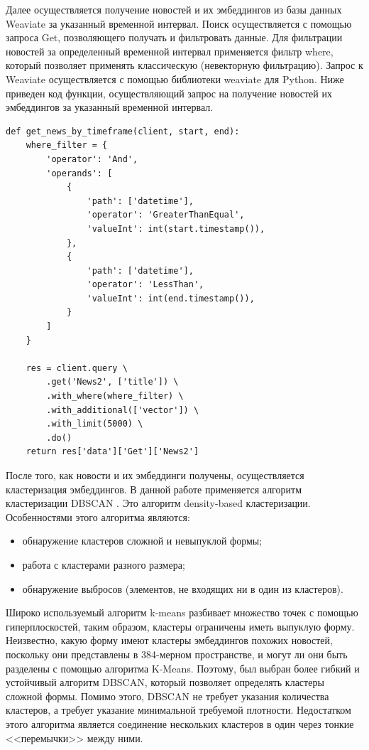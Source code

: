 Далее осуществляется получение новостей и их эмбеддингов из базы данных Weaviate за указанный временной интервал. Поиск осуществляется с помощью запроса Get{}, позволяющего получать и фильтровать данные. Для фильтрации новостей за определенный временной интервал применяется фильтр where, который позволяет применять классическую (невекторную фильтрацию). Запрос к Weaviate осуществляется с помощью библиотеки weaviate для Python. Ниже приведен код функции, осуществляющий запрос на получение новостей их эмбеддингов за указанный временной интервал.

\begin{lstlisting}
def get_news_by_timeframe(client, start, end):
    where_filter = {
        'operator': 'And',
        'operands': [
            {
                'path': ['datetime'],
                'operator': 'GreaterThanEqual',
                'valueInt': int(start.timestamp()),
            },
            {
                'path': ['datetime'],
                'operator': 'LessThan',
                'valueInt': int(end.timestamp()),
            }
        ]
    }

    res = client.query \
        .get('News2', ['title']) \
        .with_where(where_filter) \
        .with_additional(['vector']) \
        .with_limit(5000) \
        .do()
    return res['data']['Get']['News2']
\end{lstlisting}

После того, как новости и их эмбеддинги получены, осуществляется кластеризация эмбеддингов. В данной работе применяется алгоритм кластеризации DBSCAN \cite{clustering-algs}. Это алгоритм density-based кластеризации. Особенностями этого алгоритма являются:
\begin{itemize}
    \item обнаружение кластеров сложной и невыпуклой формы;
    \item работа с кластерами разного размера;
    \item обнаружение выбросов (элементов, не входящих ни в один из кластеров).
\end{itemize}

Широко используемый алгоритм k-means разбивает множество точек с помощью гиперплоскостей, таким образом, кластеры ограничены иметь выпуклую форму. Неизвестно, какую форму имеют кластеры эмбеддингов похожих новостей, поскольку они представлены в 384-мерном пространстве, и могут ли они быть разделены с помощью алгоритма K-Means. Поэтому, был выбран более гибкий и устойчивый алгоритм DBSCAN, который позволяет определять кластеры сложной формы. Помимо этого, DBSCAN не требует указания количества кластеров, а требует указание минимальной требуемой плотности. Недостатком этого алгоритма является соединение нескольких кластеров в один через тонкие <<перемычки>> между ними.

